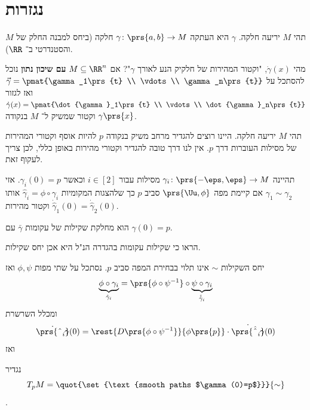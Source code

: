 \documentclass[a4paper,10pt,twoside,openany]{book}
\begin{document}
\section{נגזרות}
\begin{definition}
תהי
$M$
יריעה חלקה.
$\gamma$
היא העתקה
$\gamma \colon \prs{a,b} \to M$
חלקה (ביחס למבנה החלק של
$M$
והסטנדרטי ב־%
$\RR$).
\end{definition}
\begin{question}
מהי
$\dot{\gamma}(x)$,
"וקטור המהירות של חלקיק הנע לאורך
$\gamma$"?
אם
$M \subseteq \RR^n$
\textbf{עם שיכון נתון}
נוכל להסתכל על
$\vec{\gamma} = \pmat{\gamma_1\prs{t} \\ \vdots \\ \gamma_n\prs{t}}$
ואז לגזור
$\dot{\gamma}(x) = \pmat{\dot{\gamma}_1\prs{t} \\ \vdots \\ \dot{\gamma}_n\prs{t}}$
וקטור שמשיק ל־%
$M$
בנקודה
$\gamma\prs{x}$.
\end{question}
\begin{remark}
תהי
$M$
יריעה חלקה.
היינו רוצים להגדיר מרחב משיק בנקודה
$p$
להיות אוסף וקטורי המהירות של מסילות העוברות דרך
$p$.
אין לנו דרך טובה להגדיר וקטורי מהירות באופן כללי, לכן צריך לעקוף זאת.
\end{remark}
\begin{definition}
תהיינה
$\gamma_i \colon \prs{-\eps, \eps} \to M$
מסילות עבור
$i \in [2]$
וכאשר
$\gamma_i(0) = p$.
אזי
$\gamma_1 \sim \gamma_2$
אם קיימת מפה
$\prs{\Uu, \phi}$
סביב
$p$
כך שלהצגות המקומיות
$\hat{\gamma}_i = \phi \circ \gamma_i$
אותו וקטור מהירות
$\dot{\hat{\gamma}}_1(0) = \dot{\hat{\gamma}}_2(0)$.
\end{definition}
\begin{definition}
הוא מחלקת שקילות של עקומות
$\bar{\gamma}$
עם
$\gamma(0) = p$.
\end{definition}
\begin{exercise}
הראו כי שקילות עקומות בהגדרה הנ"ל היא אכן יחס שקילות.
\end{exercise}
\begin{remark}
יחס השקילות
$\sim$
אינו תלוי בבחירת המפה סביב
$p$.
נסתכל על שתי מפות
$\phi, \psi$
ואז
\[\underset{\hat{\gamma}_i}{\underbrace{\phi \circ \gamma_i}} = \prs{\phi \circ \psi^{-1}} \circ \underset{\hat{\hat{\gamma}}_i}{\underbrace{\psi \circ \gamma_i}}\]
ומכלל השרשרת
\[\dot{\prs{\hat{\gamma}_i}}(0) = \rest{D\prs{\phi \circ \psi^{-1}}}{\phi\prs{p}} \cdot \dot{\prs{\hat{\hat{\gamma}}_i}}(0)\] %
ואז
\end{remark}
\begin{definition}
נגדיר
\[T_p M = \quot{\set{\text{smooth paths $\gamma(0)=p$}}}{\sim}\]
.
\end{definition}
\end{document}
